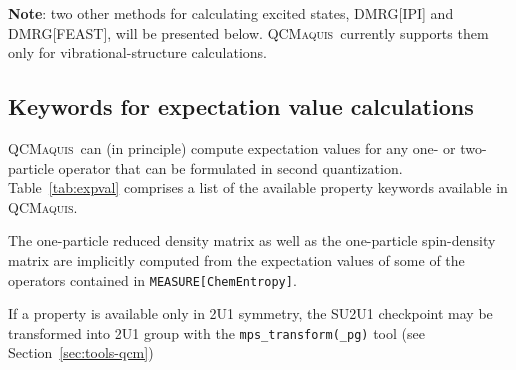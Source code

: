 \documentclass[bibliography=totoc,12pt,a4paper]{scrartcl}
\newcommand{\qcm}{\textsc{QCMaquis}}
\begin{document}
\noindent \textbf{Note}: two other methods for calculating excited states, DMRG[IPI] and DMRG[FEAST], will be presented below.
\qcm\ currently supports them only for vibrational-structure calculations.

\subsection{Keywords for expectation value calculations}
\label{subsec:prop-qcm}

\qcm\ can (in principle) compute expectation values for any one- or two-particle operator that can be formulated in second quantization.
Table~\ref{tab:expval} comprises a list of the available property keywords available in \qcm.

The one-particle reduced density matrix as well as the one-particle spin-density matrix are implicitly computed from the expectation values of some of the operators contained in \texttt{MEASURE[ChemEntropy]}.

If a property is available only in 2U1 symmetry, the SU2U1 checkpoint may be transformed into 2U1 group with the \texttt{mps\_transform(\_pg)} tool (see Section~\ref{sec:tools-qcm})
\end{document}
